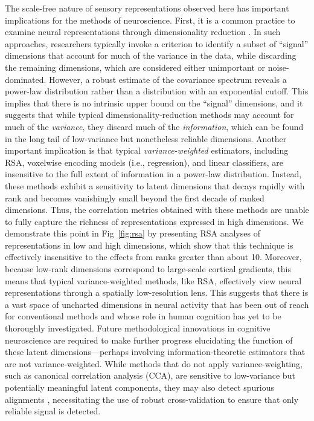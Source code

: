 \documentclass[10pt]{article}
\begin{document}
The scale-free nature of sensory representations observed here has important implications for the methods of neuroscience. First, it is a common practice to examine neural representations through dimensionality reduction \autocite{Cunningham2014,Huth2012,Haxby2011,Khosla2022,Lehky2014}. In such approaches, researchers typically invoke a criterion to identify a subset of ``signal'' dimensions that account for much of the variance in the data, while discarding the remaining dimensions, which are considered either unimportant or noise-dominated. However, a robust estimate of the covariance spectrum reveals a power-law distribution rather than a distribution with an exponential cutoff. This implies that there is no intrinsic upper bound on the ``signal'' dimensions, and it suggests that while typical dimensionality-reduction methods may account for much of the \emph{variance}, they discard much of the \emph{information}, which can be found in the long tail of low-variance but nonetheless reliable dimensions. Another important implication is that typical \emph{variance-weighted} estimators, including RSA, voxelwise encoding models (i.e., regression), and linear classifiers, are insensitive to the full extent of information in a power-law distribution. Instead, these methods exhibit a sensitivity to latent dimensions that decays rapidly with rank and becomes vanishingly small beyond the first decade of ranked dimensions. Thus, the correlation metrics obtained with these methods are unable to fully capture the richness of representations expressed in high dimensions. We demonstrate this point in Fig~\ref{fig:rsa} by presenting RSA analyses of representations in low and high dimensions, which show that this technique is effectively insensitive to the effects from ranks greater than about 10. Moreover, because low-rank dimensions correspond to large-scale cortical gradients, this means that typical variance-weighted methods, like RSA, effectively view neural representations through a spatially low-resolution lens. This suggests that there is a vast space of uncharted dimensions in neural activity that has been out of reach for conventional methods and whose role in human cognition has yet to be thoroughly investigated. Future methodological innovations in cognitive neuroscience are required to make further progress elucidating the function of these latent dimensions---perhaps involving information-theoretic estimators that are not variance-weighted. While methods that do not apply variance-weighting, such as canonical correlation analysis (CCA), are sensitive to low-variance but potentially meaningful latent components, they may also detect spurious alignments \autocite{Kornblith2019}, necessitating the use of robust cross-validation to ensure that only reliable signal is detected.
\end{document}
